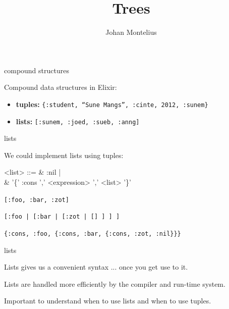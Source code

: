 

\title[ID1019 Trees]{Trees}


\author{Johan Montelius}
\date{\semester}



\begin{frame}
\titlepage
\end{frame}

\begin{frame}{compound structures}

Compound data structures in Elixir:

\begin{itemize}
 \item {\bf tuples:} {\tt \{:student, ``Sune Mangs'', :cinte, 2012,  :sunem\}}
 \item {\bf lists:} {\tt [:sunem, :joed, :sueb, :anng]}
\end{itemize}
\end{frame}


\begin{frame}{lists}

We could implement lists using tuples:
 
\pause

\begin{code}
   <list> ::=  & :nil | \\
               & '\{' :cons ',' <expression> ',' <list> '\}'
\end{code}


\pause \vspace{20pt}
{\tt [:foo, :bar, :zot]}

\pause \vspace{10pt}
{\tt [:foo | [:bar | [:zot | [] ] ] ] }
 
\pause \vspace{10pt}
{\tt \{:cons, :foo, \{:cons, :bar, \{:cons, :zot, :nil\}\}\}}

\end{frame}


\begin{frame}{lists}

\pause Lists gives us a convenient syntax ... \pause once you get use to it.
\vspace{20pt}

\pause Lists are handled more efficiently by the compiler and run-time system.

\vspace{20pt}
\pause Important to understand when to use lists and when to use tuples.

\end{frame}

